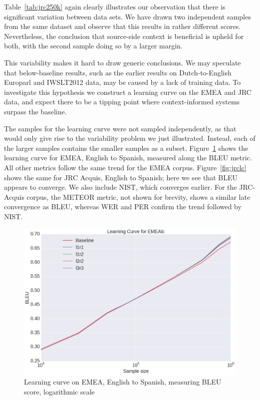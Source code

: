 \documentclass[smallextended]{svjour3}       %
\theoremstyle{break}
\begin{document}
Table~\ref{tab:jrc250k} again clearly illustrates our observation that there is
significant variation between data sets. We have drawn two independent samples
from the same dataset and observe that this results in rather different scores.
Nevertheless, the conclusion that source-side context is beneficial is upheld
for both, with the second sample doing so by a larger margin. 

This variability makes it hard to draw generic conclusions.  We may speculate
that below-baseline results, such as the earlier results on Dutch-to-English
Europarl and IWSLT2012 data, may be caused by a lack of training data. To
investigate this hypothesis we construct a learning curve on the EMEA and JRC
data, and expect there to be a tipping point where context-informed systems
surpass the baseline.

The samples for the learning curve were not sampled independently, as that
would only give rise to the variability problem we just illustrated.  Instead,
each of the larger samples contains the smaller samples as a subset.
Figure~\ref{fig:emealc} shows the learning curve for EMEA, English to Spanish,
measured along the BLEU metric. All other metrics follow the same trend for the
EMEA corpus.  Figure~\ref{fig:jrclc} shows the same for JRC Acquis, English to
Spanish; here we see that BLEU appears to converge. We also include
NIST, which converges earlier. For the JRC-Acquis corpus, the METEOR metric, not shown for
brevity, shows a similar late convergence as BLEU, whereas WER and PER confirm
the trend followed by NIST.

\begin{figure}
\includegraphics[width=120.00mm]{emealcbleu.png}
\caption{Learning curve on EMEA, English to Spanish, measuring BLEU score, logarithmic scale}
\label{fig:emealc}
\end{figure}
\end{document}
